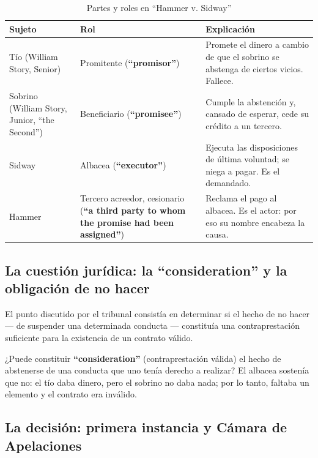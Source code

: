 \documentclass[12pt,oneside]{book}
\begin{document}
\begin{table}[H]
\centering
\caption{\texorpdfstring{Partes y roles en ``Hammer v. Sidway''}{Partes y roles en Hammer v. Sidway}}
\begin{tabularx}{\textwidth}{
    >{\raggedright\arraybackslash}p{}
    >{\raggedright\arraybackslash}p{}
    >{\raggedright\arraybackslash}X
}
\toprule
\textbf{Sujeto} & \textbf{Rol} & \textbf{Explicación} \\
\midrule
Tío (William Story, Senior) & Promitente (\textbf{``promisor''}) & Promete el dinero a cambio de que el sobrino se abstenga de ciertos vicios. Fallece. \\
Sobrino (William Story, Junior, ``the Second'') & Beneficiario (\textbf{``promisee''}) & Cumple la abstención y, cansado de esperar, cede su crédito a un tercero. \\
Sidway & Albacea (\textbf{``executor''}) & Ejecuta las disposiciones de última voluntad; se niega a pagar. Es el demandado. \\
Hammer & Tercero acreedor, cesionario (\textbf{``a third party to whom the promise had been assigned''}) & Reclama el pago al albacea. Es el actor: por eso su nombre encabeza la causa. \\
\bottomrule
\end{tabularx}
\end{table}

\subsection{\texorpdfstring{La cuestión jurídica: la ``consideration'' y la obligación de no hacer}{La cuestión jurídica: la consideration y la obligación de no hacer}}

El punto discutido por el tribunal consistía en determinar si el hecho de no hacer --- de suspender una determinada conducta --- constituía una contraprestación suficiente para la existencia de un contrato válido.

\begin{important}
¿Puede constituir \textbf{``consideration''} (contraprestación válida) el hecho de abstenerse de una conducta que uno tenía derecho a realizar? El albacea sostenía que no: el tío daba dinero, pero el sobrino no daba nada; por lo tanto, faltaba un elemento y el contrato era inválido.
\end{important}

\subsection{La decisión: primera instancia y Cámara de Apelaciones}
\end{document}
